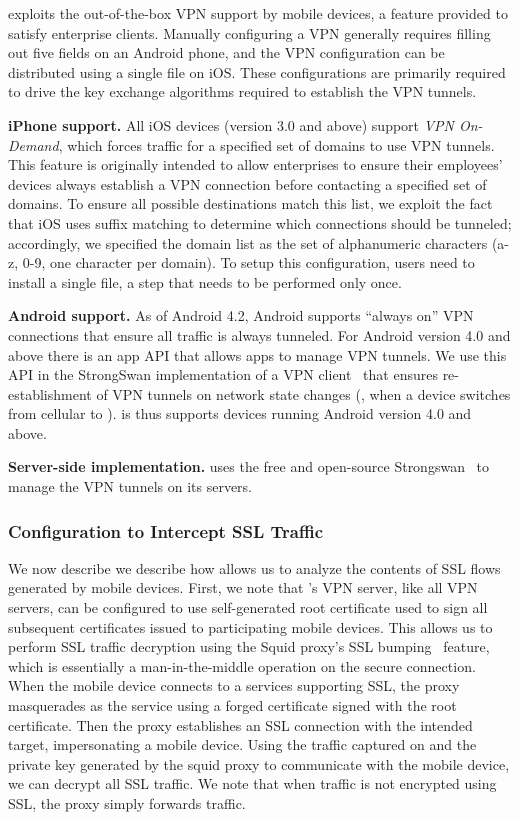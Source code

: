 \meddle exploits the out-of-the-box VPN support by mobile devices, a feature provided to satisfy enterprise clients. 
Manually configuring a VPN generally requires filling out five fields on an Android phone, and the VPN configuration can be distributed using a single file on iOS. 
These configurations are primarily required to drive the key exchange algorithms required to establish the VPN tunnels. 

\noindent\textbf{iPhone support.} 
All iOS devices (version 3.0 and above) support \textit{VPN On-Demand}, which forces traffic for a specified set of domains to use VPN tunnels. 
This feature is originally intended to allow enterprises to ensure their employees' devices always establish a VPN connection before contacting a specified set of domains. 
To ensure all possible destinations match this list, we exploit the fact that iOS uses suffix matching to determine which connections should be tunneled; accordingly, we specified the domain list as the set of alphanumeric characters (a-z, 0-9, one character per domain). 
To setup this configuration, users need to install a single file, a step that needs to be performed only once. 

\noindent\textbf{Android support.} As of Android 4.2, Android supports ``always on'' VPN connections that ensure all traffic is always tunneled.
For Android version 4.0 and above there is an app API that allows apps to manage VPN tunnels. 
We use this API in the StrongSwan implementation of a VPN client~\cite{strongswanclient} that ensures re-establishment of VPN tunnels on network state changes (\eg, when a device switches from cellular to \wifi).
\meddle is thus supports devices running Android version 4.0 and above.

\noindent\textbf{Server-side implementation.} 
\meddle uses the free and open-source Strongswan~\cite{strongswan} to manage the VPN tunnels on its servers. 

\subsubsection{Configuration to Intercept SSL Traffic}

We now describe we describe how \meddle allows us to analyze the contents of SSL flows generated by mobile devices.
First, we note that \meddle's VPN server, like all VPN servers, can be configured to use self-generated root certificate used to sign all subsequent certificates issued to participating mobile devices. 
This allows us to perform SSL traffic decryption using the Squid proxy's SSL bumping~\cite{sslbump} feature, which is essentially a man-in-the-middle operation on the secure connection.
When the mobile device connects to a services supporting SSL, the proxy masquerades as the service using a forged certificate signed with the \meddle root certificate. 
Then the proxy establishes an SSL connection with the intended target, impersonating a mobile device. 
Using the traffic captured on \meddle and the private key generated by the squid proxy to communicate with the mobile device, we can decrypt all SSL traffic.
We note that when traffic is not encrypted using SSL, the proxy simply forwards traffic. 


